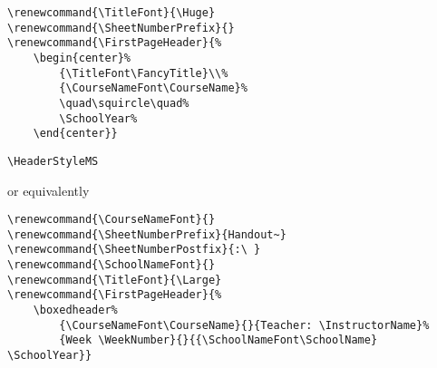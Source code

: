 \documentclass[12pt,twoside,parskip,notitle]{handout}
\begin{document}
\newpage

\begingroup
\renewcommand{\TitleFont}{\Huge}
\renewcommand{\SheetNumberPrefix}{}
\renewcommand{\FirstPageHeader}{%
	\begin{center}%
		{\TitleFont\FancyTitle}\\%
		{\CourseNameFont\CourseName}%
		\quad\squircle\quad%
		\SchoolYear%
	\end{center}}
\maketitle
\begin{verbatim}
\renewcommand{\TitleFont}{\Huge}
\renewcommand{\SheetNumberPrefix}{}
\renewcommand{\FirstPageHeader}{%
    \begin{center}%
        {\TitleFont\FancyTitle}\\%
        {\CourseNameFont\CourseName}%
        \quad\squircle\quad%
        \SchoolYear%
    \end{center}}
\end{verbatim}
\endgroup

\newpage

\begingroup
\HeaderStyleMS
\maketitle
\verb|\HeaderStyleMS|

or equivalently

\begin{verbatim}
\renewcommand{\CourseNameFont}{}
\renewcommand{\SheetNumberPrefix}{Handout~}
\renewcommand{\SheetNumberPostfix}{:\ }
\renewcommand{\SchoolNameFont}{}
\renewcommand{\TitleFont}{\Large}
\renewcommand{\FirstPageHeader}{%
    \boxedheader%
        {\CourseNameFont\CourseName}{}{Teacher: \InstructorName}%
        {Week \WeekNumber}{}{{\SchoolNameFont\SchoolName} \SchoolYear}}
\end{verbatim}
\endgroup
\end{document}
